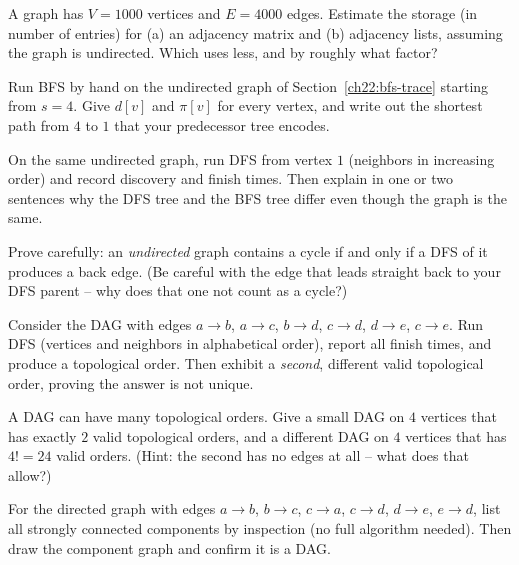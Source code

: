 \begin{exercise}
\label{ch22:ex-rep}
A graph has $V = 1000$ vertices and $E = 4000$ edges. Estimate the storage (in
number of entries) for (a) an adjacency matrix and (b) adjacency lists, assuming
the graph is undirected. Which uses less, and by roughly what factor?
\end{exercise}

\begin{exercise}
\label{ch22:ex-bfs-trace}
Run BFS by hand on the undirected graph of Section~\ref{ch22:bfs-trace} starting
from $s = 4$. Give $d[v]$ and $\pi[v]$ for every vertex, and write out the
shortest path from $4$ to $1$ that your predecessor tree encodes.
\end{exercise}

\begin{exercise}
\label{ch22:ex-bfs-vs-dfs}
On the same undirected graph, run DFS from vertex $1$ (neighbors in increasing
order) and record discovery and finish times. Then explain in one or two
sentences why the DFS tree and the BFS tree differ even though the graph is the
same.
\end{exercise}

\begin{exercise}
\label{ch22:ex-cycle}
Prove carefully: an \emph{undirected} graph contains a cycle if and only if a DFS
of it produces a back edge. (Be careful with the edge that leads straight back to
your DFS parent -- why does that one not count as a cycle?)
\end{exercise}

\begin{exercise}
\label{ch22:ex-toposort}
Consider the DAG with edges
$a\to b$, $a\to c$, $b\to d$, $c\to d$, $d\to e$, $c\to e$. Run DFS (vertices and
neighbors in alphabetical order), report all finish times, and produce a
topological order. Then exhibit a \emph{second}, different valid topological
order, proving the answer is not unique.
\end{exercise}

\begin{exercise}
\label{ch22:ex-many-toposorts}
A DAG can have many topological orders. Give a small DAG on $4$ vertices that has
exactly $2$ valid topological orders, and a different DAG on $4$ vertices that
has $4! = 24$ valid orders. (Hint: the second has no edges at all -- what does
that allow?)
\end{exercise}

\begin{exercise}
\label{ch22:ex-scc-count}
For the directed graph with edges $a\to b$, $b\to c$, $c\to a$, $c\to d$,
$d\to e$, $e\to d$, list all strongly connected components by inspection (no full
algorithm needed). Then draw the component graph and confirm it is a DAG.
\end{exercise}

